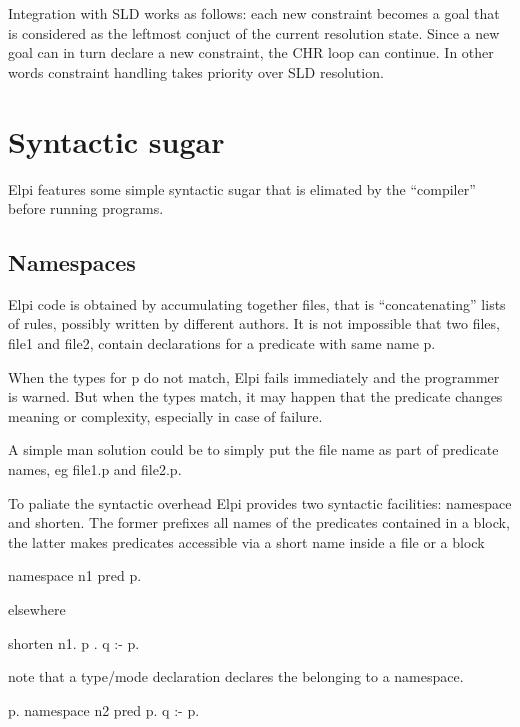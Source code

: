 \documentclass[a4paper, 11pt]{book}
\begin{document}
Integration with SLD works as follows: each new constraint becomes
a goal that is considered as the leftmost conjuct of the current
resolution state. Since a new goal can in turn declare a new constraint,
the CHR loop can continue. In other words constraint handling takes
priority over SLD resolution.

\section{Syntactic sugar}

Elpi features some simple syntactic sugar that is elimated by
the ``compiler'' before running programs.

\subsection{Namespaces}

Elpi code is obtained by accumulating together files, that is
``concatenating'' lists of rules, possibly written by different
authors. It is not impossible that
two files, file1 and file2, contain declarations for a predicate with same name p.

When the types for p do not match, Elpi fails immediately
and the programmer is warned. But when the types match, it may
happen that the predicate changes meaning or complexity,
especially in case of failure.

A simple man solution could be to simply put the file name
as part of predicate names, eg file1.p and file2.p.

To paliate the syntactic overhead Elpi provides two syntactic
facilities: namespace and shorten. The former prefixes all
names of the predicates contained in a block, the latter makes
predicates accessible via a short name inside a file or a block

\begin{elpicode}
namespace n1 {
  pred p.
}
\end{elpicode}

elsewhere

\begin{elpicode}
shorten n1.{ p }.
q :- p.
\end{elpicode}

note that a type/mode declaration declares the belonging to a namespace.

\begin{elpicode}
p.
namespace n2 {
  pred p.
  q :- p.
}
\end{elpicode}
\end{document}
